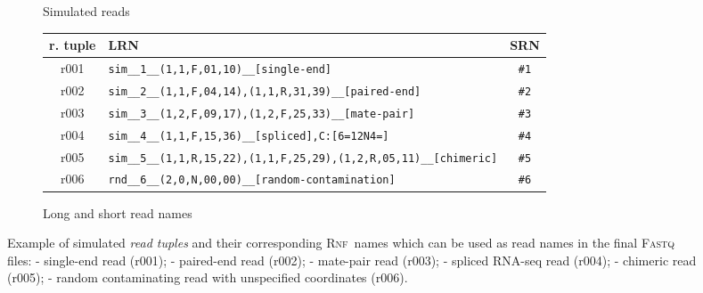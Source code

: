 \documentclass[10pt,a4paper]{article}
\newcommand{\RNF}{\textsc{Rnf}}
\begin{document}
\begin{figure}[!tpb]
\centering

\begin{subfigure}{1.0\linewidth}
\centering
{}

\caption{Simulated reads}
\end{subfigure}


\begin{subfigure}{1.0\linewidth}
\centering
\begin{tabular}{c|p{12.0cm}|c}
 \textbf{r. tuple} & \textbf{LRN} & \textbf{SRN} \\\hline
 r001
 	& \texttt{sim\_\_1\_\_(1,1,F,01,10)\_\_[single-end]}
 	& \texttt{\#1}
 \\\hline
 r002
 	& \texttt{sim\_\_2\_\_(1,1,F,04,14),(1,1,R,31,39)\_\_[paired-end]}
 	& \texttt{\#2}
 \\\hline
 r003
 	& \texttt{sim\_\_3\_\_(1,2,F,09,17),(1,2,F,25,33)\_\_[mate-pair]}
 	& \texttt{\#3}
 \\\hline
 r004
 	& \texttt{sim\_\_4\_\_(1,1,F,15,36)\_\_[spliced],{}C:[6=12N4=]}
   	& \texttt{\#4}
 \\\hline
 r005
 	& \texttt{sim\_\_5\_\_(1,1,R,15,22),(1,1,F,25,29),(1,2,R,05,11)\_\_[chimeric]}
 	& \texttt{\#5}
 \\\hline
 r006
 	& \texttt{rnd\_\_6\_\_(2,0,N,00,00)\_\_[random-contamination]}
 	& \texttt{\#6}\\
\end{tabular}
\caption{Long and short read names}
\end{subfigure}
\caption{Example of simulated {\em read tuples} and their corresponding
\RNF\ names which can be used as read names
in the final \textsc{Fastq} files:\newline
- single-end read (r001);\newline
- paired-end read (r002);\newline
- mate-pair read (r003);\newline
- spliced RNA-seq read (r004); \newline
- chimeric read (r005);\newline
- random contaminating read with unspecified coordinates (r006).
}
\end{figure}
\end{document}
